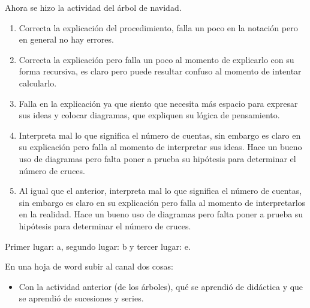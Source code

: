 \documentclass[12pt]{report}
\newcounter{it}
\theoremstyle{largebreak}
\begin{document}
    Ahora se hizo la actividad del árbol de navidad.

    \renewcommand{\theenumi}{\alph{enumi}}

    \begin{enumerate}
        \item Correcta la explicación del procedimiento, falla un poco en la notación pero en general no hay errores.
        \item Correcta la explicación pero falla un poco al momento de explicarlo con su forma recursiva, es claro pero puede resultar confuso al momento de intentar calcularlo.
        \item Falla en la explicación ya que siento que necesita más espacio para expresar sus ideas y colocar diagramas, que expliquen su lógica de pensamiento.
        \item Interpreta mal lo que significa el número de cuentas, sin embargo es claro en su explicación pero falla al momento de interpretar sus ideas. Hace un bueno uso de diagramas pero falta poner a prueba su hipótesis para determinar el número de cruces.
        \item Al igual que el anterior, interpreta mal lo que significa el número de cuentas, sin embargo es claro en su explicación pero falla al momento de interpretarlos en la realidad. Hace un bueno uso de diagramas pero falta poner a prueba su hipótesis para determinar el número de cruces.
    \end{enumerate}

    Primer lugar: a, segundo lugar: b y tercer lugar: e.

    \begin{excer}
        En una hoja de word subir al canal dos cosas:
        \begin{itemize}
            \item Con la actividad anterior (de los árboles), qué se aprendió de didáctica y que se aprendió de sucesiones y series.
        \end{itemize}
    \end{excer}
\end{document}
